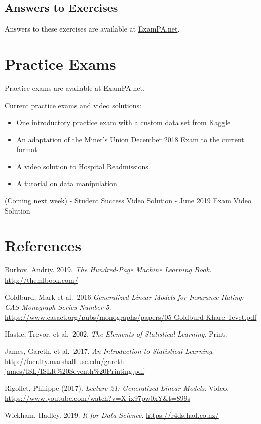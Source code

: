\documentclass[openany]{book}
\providecommand{\tightlist}{%
  \setlength{\itemsep}{0pt}\setlength{\parskip}{0pt}}
\begin{document}
\hypertarget{answers-to-exercises-1}{%
\section{Answers to Exercises}\label{answers-to-exercises-1}}

Answers to these exercises are available at \href{https://www.exampa.net/pricing}{ExamPA.net}.

\hypertarget{practice-exams}{%
\chapter{Practice Exams}\label{practice-exams}}

Practice exams are available at \href{https://www.exampa.net/pricing}{ExamPA.net}.

Current practice exams and video solutions:

\begin{itemize}
\tightlist
\item
  One introductory practice exam with a custom data set from Kaggle
\item
  An adaptation of the Miner's Union December 2018 Exam to the current format
\item
  A video solution to Hospital Readmissions
\item
  A tutorial on data manipulation
\end{itemize}

(Coming next week)
- Student Success Video Solution
- June 2019 Exam Video Solution

\hypertarget{references}{%
\chapter{References}\label{references}}

Burkov, Andriy. 2019. \emph{The Hundred-Page Machine Learning Book.} \url{http://themlbook.com/}

Goldburd, Mark et al.~2016.\emph{Generalized Linear Models for Insurance Rating: CAS Monograph Series Number 5}. \url{https://www.casact.org/pubs/monographs/papers/05-Goldburd-Khare-Tevet.pdf}

Hastie, Trevor, et al.~2002. \emph{The Elements of Statistical Learning}. Print.

James, Gareth, et al.~2017. \emph{An Introduction to Statistical Learning}.
\url{http://faculty.marshall.usc.edu/gareth-james/ISL/ISLR\%20Seventh\%20Printing.pdf}

Rigollet, Philippe (2017). \emph{Lecture 21: Generalized Linear Models}. Video. \url{https://www.youtube.com/watch?v=X-ix97pw0xY\&t=899s}

Wickham, Hadley. 2019. \emph{R for Data Science}. \url{https://r4ds.had.co.nz/}


\end{document}
